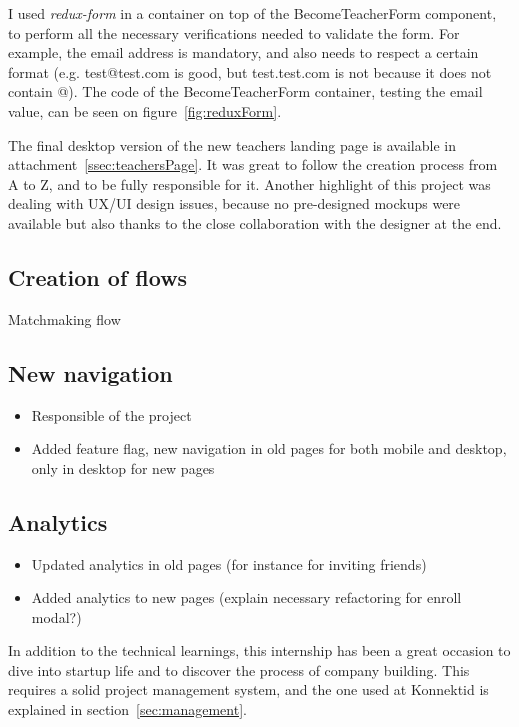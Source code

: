 I used \textit{redux-form} in a container on top of the BecomeTeacherForm component, to perform all the necessary verifications needed to validate the form. For example, the email address is mandatory, and also needs to respect a certain format (e.g. test@test.com is good, but test.test.com is not because it does not contain @). The code of the BecomeTeacherForm container, testing the email value, can be seen on {\sc figure}~\ref{fig:reduxForm}. 

The final desktop version of the new teachers landing page is available in {\sc attachment}~\ref{ssec:teachersPage}. It was great to follow the creation process from A to Z, and to be fully responsible for it. Another highlight of this project was dealing with UX/UI design issues, because no pre-designed mockups were available but also thanks to the close collaboration with the designer at the end.

\subsection{Creation of flows}
\label{ssec:flows}

Matchmaking flow

\subsection{New navigation}
\label{ssec:new_nav}

\begin{itemize}
    \item Responsible of the project
    \item Added feature flag, new navigation in old pages for both mobile and desktop, only in desktop for new pages
\end{itemize}

\subsection{Analytics}
\label{ssec:analytics}

\begin{itemize}
    \item Updated analytics in old pages (for instance for inviting friends)
    \item Added analytics to new pages (explain necessary refactoring for enroll modal?)
\end{itemize}

In addition to the technical learnings, this internship has been a great occasion to dive into startup life and to discover the process of company building. This requires a solid project management system, and the one used at Konnektid is explained in {\sc section}~\ref{sec:management}.